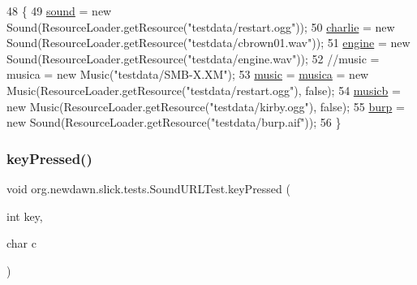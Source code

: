 \begin{DoxyCode}
48                                                                     \{
49         \mbox{\hyperlink{classorg_1_1newdawn_1_1slick_1_1tests_1_1_sound_u_r_l_test_ab150fd35e50f91877ded465e208d26a0}{sound}} = \textcolor{keyword}{new} Sound(ResourceLoader.getResource(\textcolor{stringliteral}{"testdata/restart.ogg"}));
50         \mbox{\hyperlink{classorg_1_1newdawn_1_1slick_1_1tests_1_1_sound_u_r_l_test_a5806820024f40319f19973c5898df29f}{charlie}} = \textcolor{keyword}{new} Sound(ResourceLoader.getResource(\textcolor{stringliteral}{"testdata/cbrown01.wav"}));
51         \mbox{\hyperlink{classorg_1_1newdawn_1_1slick_1_1tests_1_1_sound_u_r_l_test_a6a0807b2ab81a3514960bcc33ebea163}{engine}} = \textcolor{keyword}{new} Sound(ResourceLoader.getResource(\textcolor{stringliteral}{"testdata/engine.wav"}));
52         \textcolor{comment}{//music = musica = new Music("testdata/SMB-X.XM");}
53         \mbox{\hyperlink{classorg_1_1newdawn_1_1slick_1_1tests_1_1_sound_u_r_l_test_ab3104882d68cde6d826346758faec7fb}{music}} = \mbox{\hyperlink{classorg_1_1newdawn_1_1slick_1_1tests_1_1_sound_u_r_l_test_a140b3587b3f01282ba0d26ee65dc3944}{musica}} = \textcolor{keyword}{new} Music(ResourceLoader.getResource(\textcolor{stringliteral}{"testdata/restart.ogg"}), \textcolor{keyword}{false});
54         \mbox{\hyperlink{classorg_1_1newdawn_1_1slick_1_1tests_1_1_sound_u_r_l_test_a914a174ac8607249f88d11c614026c2b}{musicb}} = \textcolor{keyword}{new} Music(ResourceLoader.getResource(\textcolor{stringliteral}{"testdata/kirby.ogg"}), \textcolor{keyword}{false});
55         \mbox{\hyperlink{classorg_1_1newdawn_1_1slick_1_1tests_1_1_sound_u_r_l_test_ab2a8a13c8051ebda18fe29e2f31b24b3}{burp}} = \textcolor{keyword}{new} Sound(ResourceLoader.getResource(\textcolor{stringliteral}{"testdata/burp.aif"}));
56     \}
\end{DoxyCode}
\mbox{\label{classorg_1_1newdawn_1_1slick_1_1tests_1_1_sound_u_r_l_test_a457ceb805590c0e539de1e1af83da51d}} 
\subsubsection{\texorpdfstring{key\+Pressed()}{keyPressed()}}
{\footnotesize\ttfamily void org.\+newdawn.\+slick.\+tests.\+Sound\+U\+R\+L\+Test.\+key\+Pressed (\begin{DoxyParamCaption}\item[{int}]{key,  }\item[{char}]{c }\end{DoxyParamCaption})\hspace{0.3cm}{\ttfamily [inline]}}

